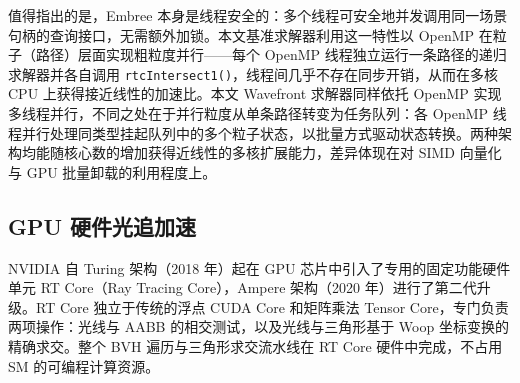 值得指出的是，Embree 本身是线程安全的：多个线程可安全地并发调用同一场景句柄的查询接口，无需额外加锁。本文基准求解器利用这一特性以 OpenMP 在粒子（路径）层面实现粗粒度并行——每个 OpenMP 线程独立运行一条路径的递归求解器并各自调用 \texttt{rtcIntersect1()}，线程间几乎不存在同步开销，从而在多核 CPU 上获得接近线性的加速比。本文 Wavefront 求解器同样依托 OpenMP 实现多线程并行，不同之处在于并行粒度从单条路径转变为任务队列：各 OpenMP 线程并行处理同类型挂起队列中的多个粒子状态，以批量方式驱动状态转换。两种架构均能随核心数的增加获得近线性的多核扩展能力，差异体现在对 SIMD 向量化与 GPU 批量卸载的利用程度上。

\subsection{GPU 硬件光追加速}

NVIDIA 自 Turing 架构（2018 年）起在 GPU 芯片中引入了专用的固定功能硬件单元 RT Core（Ray Tracing Core），Ampere 架构（2020 年）进行了第二代升级。RT Core 独立于传统的浮点 CUDA Core 和矩阵乘法 Tensor Core，专门负责两项操作：光线与 AABB 的相交测试，以及光线与三角形基于 Woop 坐标变换的精确求交。整个 BVH 遍历与三角形求交流水线在 RT Core 硬件中完成，不占用 SM 的可编程计算资源。

